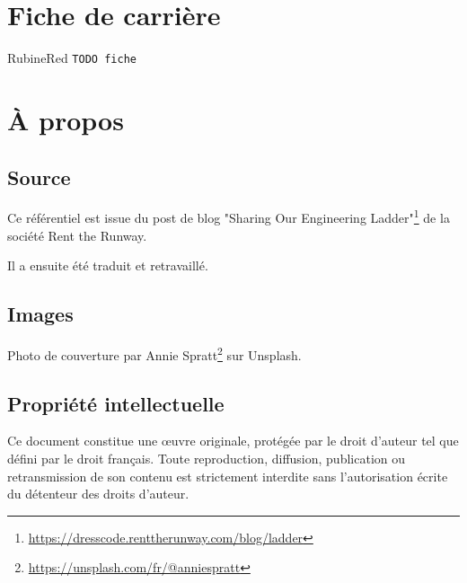 \documentclass[a4paper, french, openany, 12pt]{book}
\newcommand{\todo}[1]{
  \begin{color}{RubineRed}
    \texttt{TODO {#1}}
  \end{color}
}
\begin{document}
\backmatter

\chapter*{Fiche de carrière}

\todo{fiche}

\chapter*{À propos}

\begin{multicols}{2}
  \section*{Source}
  
  Ce référentiel est issue du post de blog 
  "Sharing Our Engineering Ladder"\footnote{\url{https://dresscode.renttherunway.com/blog/ladder}}
  de la société Rent the Runway.
  
  Il a ensuite été traduit et retravaillé.
  
  \section*{Images}
  
  Photo de couverture par Annie Spratt\footnote{\url{https://unsplash.com/fr/@anniespratt}} sur Unsplash.
  
  \section*{Propriété intellectuelle}
  
  Ce document constitue une \oe uvre originale, protégée par le droit d'auteur tel que défini par le droit français.
  Toute reproduction, diffusion, publication ou retransmission de son contenu est strictement interdite sans 
  l'autorisation écrite du détenteur des droits d'auteur.
\end{multicols}

\tableofcontents
\end{document}
